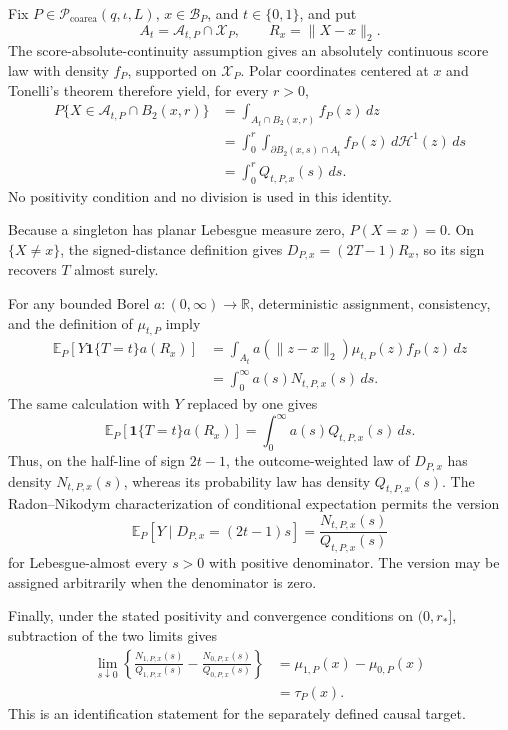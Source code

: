 Fix \(P\in\mathcal P_{\mathrm{coarea}}(q,\iota,L)\), \(x\in\mathcal B_P\), and \(t\in\{0,1\}\), and put
\[
 A_t=\mathcal A_{t,P}\cap\mathcal X_P,
 \qquad R_x=\lVert X-x\rVert_2.
\]
The score-absolute-continuity assumption gives an absolutely continuous score law with density \(f_P\), supported on \(\mathcal X_P\).  Polar coordinates centered at \(x\) and Tonelli's theorem therefore yield, for every \(r>0\),
\[
\begin{aligned}
 P\{X\in\mathcal A_{t,P}\cap B_2(x,r)\}
 &=\int_{A_t\cap B_2(x,r)}f_P(z)\,dz\\
 &=\int_0^r\int_{\partial B_2(x,s)\cap A_t}
 f_P(z)\,d\mathcal H^1(z)\,ds\\
 &=\int_0^rQ_{t,P,x}(s)\,ds.
\end{aligned}
\]
No positivity condition and no division is used in this identity.

Because a singleton has planar Lebesgue measure zero, \(P(X=x)=0\).  On \(\{X\neq x\}\), the signed-distance definition gives \(D_{P,x}=(2T-1)R_x\), so its sign recovers \(T\) almost surely.

For any bounded Borel \(a:(0,\infty)\to\mathbb R\), deterministic assignment, consistency, and the definition of \(\mu_{t,P}\) imply
\[
\begin{aligned}
 \mathbb E_P[Y\mathbf1\{T=t\}a(R_x)]
 &=\int_{A_t}a(\lVert z-x\rVert_2)\mu_{t,P}(z)f_P(z)\,dz\\
 &=\int_0^\infty a(s)N_{t,P,x}(s)\,ds.
\end{aligned}
\]
The same calculation with \(Y\) replaced by one gives
\[
 \mathbb E_P[\mathbf1\{T=t\}a(R_x)]
 =\int_0^\infty a(s)Q_{t,P,x}(s)\,ds.
\]
Thus, on the half-line of sign \(2t-1\), the outcome-weighted law of \(D_{P,x}\) has density \(N_{t,P,x}(s)\), whereas its probability law has density \(Q_{t,P,x}(s)\).  The Radon--Nikodym characterization of conditional expectation permits the version
\[
 \mathbb E_P[Y\mid D_{P,x}=(2t-1)s]
 =\frac{N_{t,P,x}(s)}{Q_{t,P,x}(s)}
\]
for Lebesgue-almost every \(s>0\) with positive denominator.  The version may be assigned arbitrarily when the denominator is zero.

Finally, under the stated positivity and convergence conditions on \((0,r_*]\), subtraction of the two limits gives
\[
\begin{aligned}
 \lim_{s\downarrow0}\left\{
 \frac{N_{1,P,x}(s)}{Q_{1,P,x}(s)}-
 \frac{N_{0,P,x}(s)}{Q_{0,P,x}(s)}\right\}
 &=\mu_{1,P}(x)-\mu_{0,P}(x)\\
 &=\tau_P(x).
\end{aligned}
\]
This is an identification statement for the separately defined causal target.